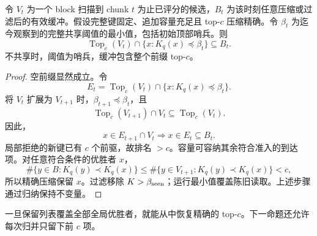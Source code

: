 \begin{resultblock}
\begin{lemma}[局部缓冲保留]
\label{lem:5-buffer}
令 $V_t$ 为一个 block 扫描到 chunk $t$ 为止已评分的候选，$B_t$ 为该时刻任意压缩或过滤后的有效缓冲。假设完整键固定、追加容量充足且 top-$c$ 压缩精确。令 $\beta_t$ 为迄今观察到的完整共享阈值的最小值，包括初始顶部哨兵。则
\begin{equation}
 \operatorname{Top}_c(V_t)\cap\{x:K_q(x)\preceq\beta_t\}
 \subseteq B_t.
 \label{eq:5-buffer-invariant}
\end{equation}
不共享时，阈值为哨兵，缓冲包含整个前缀 top-$c$。
\end{lemma}
\begin{proof}
空前缀显然成立。令
\[
 E_t=\operatorname{Top}_c(V_t)\cap\{x:K_q(x)\preceq\beta_t\}.
\]
将 $V_t$ 扩展为 $V_{t+1}$ 时，$\beta_{t+1}\preceq\beta_t$，且
\[
 \operatorname{Top}_c(V_{t+1})\cap V_t\subseteq\operatorname{Top}_c(V_t).
\]
因此，
\[
 x\in E_{t+1}\cap V_t\Rightarrow x\in E_t\subseteq B_t.
\]
局部拒绝的新键已有 $c$ 个前驱，故排名 $>c$。容量可容纳其余符合准入的到达项。对任意符合条件的优胜者 $x$，
\[
 \#\{y\in B:K_q(y)\prec K_q(x)\}
 \leq\#\{y\in V_{t+1}:K_q(y)\prec K_q(x)\}<c,
\]
所以精确压缩保留 $x$。过滤移除 $K>\beta_{\rm seen}$；运行最小值覆盖陈旧读取。上述步骤通过归纳保持不变量。
\end{proof}
\end{resultblock}
一旦保留列表覆盖全部全局优胜者，就能从中恢复精确的 top-$c$。下一命题还允许每次归并只留下前 $c$ 项。

